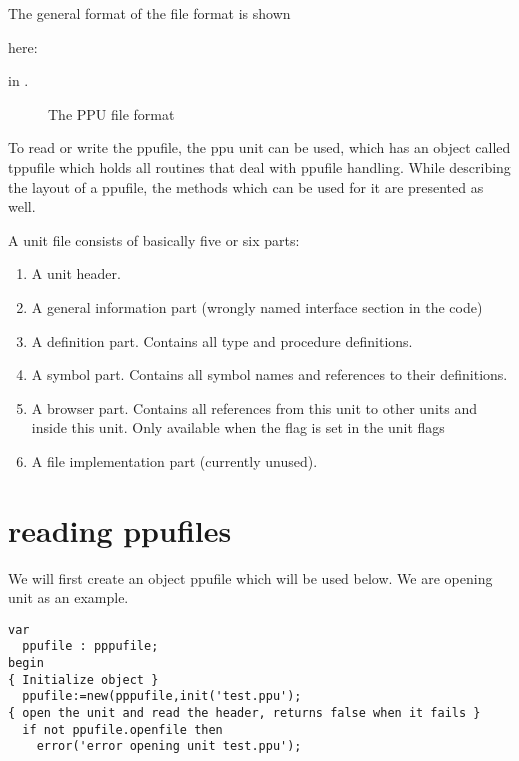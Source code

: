 {The general format of the  file format is shown
\begin{htmlonly}
here:
\end{htmlonly}
\begin{latexonly}
in .
\begin{figure}
\caption{The PPU file format}
\label{fig:ppuformat}
\begin{center}
\ifpdf
{}
\else
{}
\fi
\end{center}
\end{figure}
\end{latexonly}

To read or write the ppufile, the ppu unit  can be used,
which has an object called tppufile which holds all routines that deal
with ppufile handling. While describing the layout of a ppufile, the
methods which can be used for it are presented as well.

A unit file consists of basically five or six parts:
\begin{enumerate}
\item A unit header.
\item A general information part (wrongly named interface section in the code)
\item A definition part. Contains all type and procedure definitions.
\item A symbol part. Contains all symbol names and references to their
definitions.
\item A browser part. Contains all references from this unit to other
units and inside this unit. Only available when the  flag is
set in the unit flags
\item A file implementation part (currently unused).
\end{enumerate}

\section{reading ppufiles}

We will first create an object ppufile which will be used below. We are
opening unit  as an example.

\begin{verbatim}
var
  ppufile : pppufile;
begin
{ Initialize object }
  ppufile:=new(pppufile,init('test.ppu');
{ open the unit and read the header, returns false when it fails }
  if not ppufile.openfile then
    error('error opening unit test.ppu');


\end{verbatim}}
